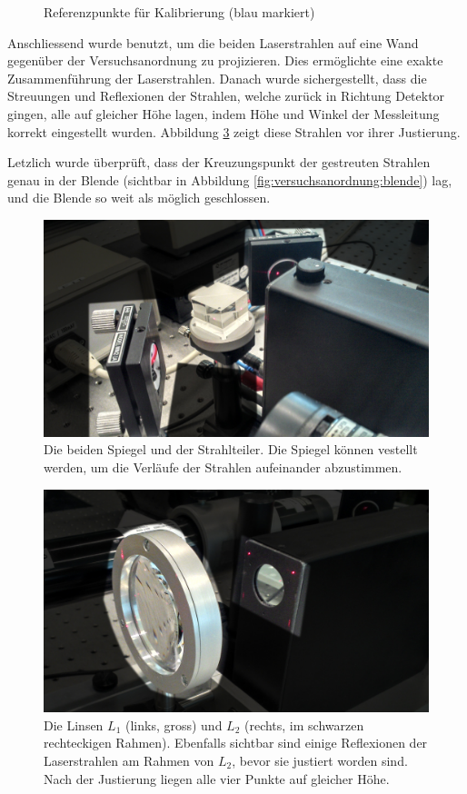 \begin{figure}[h!t]
    \centering
    \resizebox{.40\textwidth}{!}{}
    \caption{%
        Referenzpunkte f\"ur Kalibrierung (blau markiert)
    }
    \label{fig:justierung}
\end{figure}

Anschliessend wurde
benutzt,   um   die   beiden   Laserstrahlen   auf   eine   Wand   gegen\"uber
der   Versuchsanordnung  zu   projizieren. Dies   erm\"oglichte  eine   exakte
Zusammenf\"uhrung  der Laserstrahlen. Danach  wurde  sichergestellt, dass  die
Streuungen und Reflexionen der Strahlen,  welche zur\"uck in Richtung Detektor
gingen,  alle  auf  gleicher  H\"ohe   lagen,  indem  H\"ohe  und  Winkel  der
Messleitung korrekt eingestellt wurden. Abbildung \ref{fig:lensL1} zeigt diese
Strahlen vor ihrer Justierung.

Letzlich wurde \"uberpr\"uft, dass  der Kreuzungspunkt der gestreuten Strahlen
genau in der Blende (sichtbar in Abbildung \ref{fig:versuchsanordnung:blende})
lag, und die Blende so weit als m\"oglich geschlossen.

\begin{figure}[h!t]
    \centering
    \includegraphics[width=.55\textwidth]{images/spiegel.jpeg}
    \caption{%
        Die beiden Spiegel und der Strahlteiler. Die Spiegel k\"onnen vestellt
        werden, um die Verl\"aufe der Strahlen aufeinander abzustimmen.
    }
    \label{fig:spiegel}
\end{figure}


\begin{figure}[h!t]
    \centering
    \includegraphics[width=.6\textwidth]{images/linse.jpeg}
    \caption{%
        Die  Linsen  $L_1$ (links,  gross)  und  $L_2$ (rechts,  im  schwarzen
        rechteckigen  Rahmen). Ebenfalls  sichtbar   sind  einige  Reflexionen
        der  Laserstrahlen am  Rahmen  von $L_2$,  bevor  sie justiert  worden
        sind. Nach der Justierung liegen alle vier Punkte auf gleicher H\"ohe.
    }
    \label{fig:lensL1}
\end{figure}

